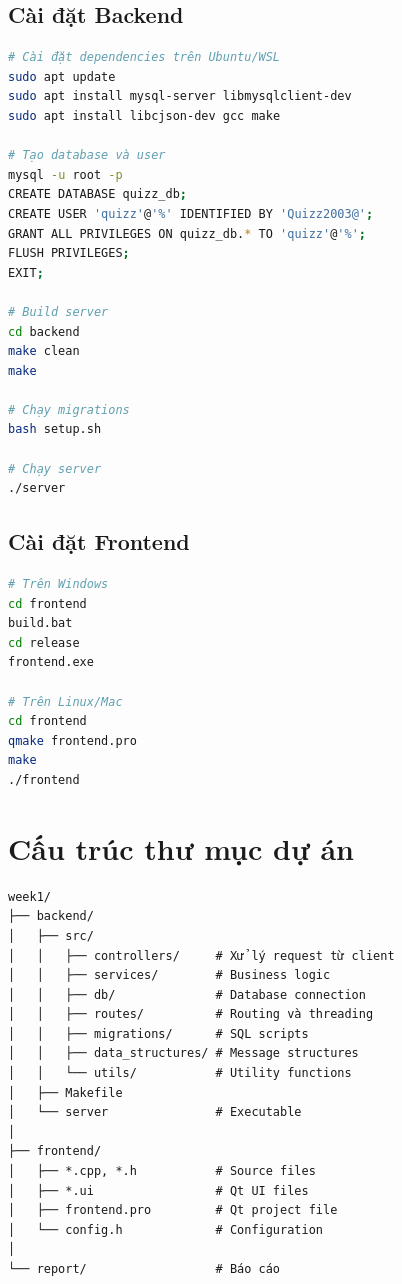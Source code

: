 \documentclass[12pt,a4paper]{report}
\begin{document}
\subsection{Cài đặt Backend}

\begin{lstlisting}[language=bash]
# Cài đặt dependencies trên Ubuntu/WSL
sudo apt update
sudo apt install mysql-server libmysqlclient-dev
sudo apt install libcjson-dev gcc make

# Tạo database và user
mysql -u root -p
CREATE DATABASE quizz_db;
CREATE USER 'quizz'@'%' IDENTIFIED BY 'Quizz2003@';
GRANT ALL PRIVILEGES ON quizz_db.* TO 'quizz'@'%';
FLUSH PRIVILEGES;
EXIT;

# Build server
cd backend
make clean
make

# Chạy migrations
bash setup.sh

# Chạy server
./server
\end{lstlisting}

\subsection{Cài đặt Frontend}

\begin{lstlisting}[language=bash]
# Trên Windows
cd frontend
build.bat
cd release
frontend.exe

# Trên Linux/Mac
cd frontend
qmake frontend.pro
make
./frontend
\end{lstlisting}

\section{Cấu trúc thư mục dự án}

\begin{verbatim}
week1/
├── backend/
│   ├── src/
│   │   ├── controllers/     # Xử lý request từ client
│   │   ├── services/        # Business logic
│   │   ├── db/              # Database connection
│   │   ├── routes/          # Routing và threading
│   │   ├── migrations/      # SQL scripts
│   │   ├── data_structures/ # Message structures
│   │   └── utils/           # Utility functions
│   ├── Makefile
│   └── server               # Executable
│
├── frontend/
│   ├── *.cpp, *.h           # Source files
│   ├── *.ui                 # Qt UI files
│   ├── frontend.pro         # Qt project file
│   └── config.h             # Configuration
│
└── report/                  # Báo cáo
\end{verbatim}
\end{document}
